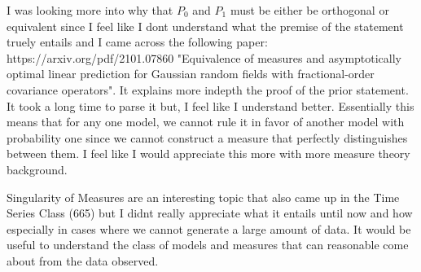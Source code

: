 \documentclass[answers,12pt,addpoints]{exam}
\begin{document}
\begin{questions}
\question I was looking more into why that $P_0$ and $P_1$ must be either be orthogonal or equivalent since I feel like I dont understand what the premise of the statement truely entails and I came across the following paper: https://arxiv.org/pdf/2101.07860 "Equivalence of measures and asymptotically optimal linear prediction for Gaussian random fields with fractional-order covariance operators". It explains more indepth the proof of the prior statement. It took a long time to parse it but, I feel like I understand better. Essentially this means that for any one model, we cannot rule it in favor of another model with probability one since we cannot construct a measure that perfectly distinguishes between them. I feel like I would appreciate this more with more measure theory background.

\question Singularity of Measures are an interesting topic that also came up in the Time Series Class (665) but I didnt really appreciate what it entails until now and how especially in cases where we cannot generate a large amount of data. It would be useful to understand the class of models and measures that can reasonable come about from the data observed. 


\end{questions}
\end{document}
